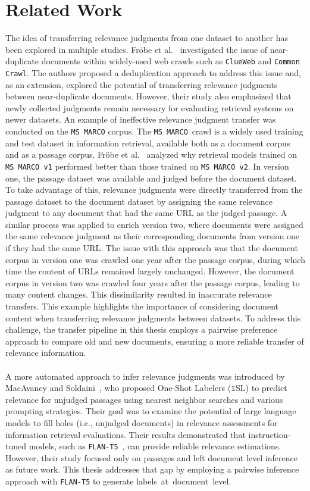 \chapter{Related Work}\label{related-work}

The idea of transferring relevance judgments from one dataset to another has been explored in multiple studies. Fr\"{o}be et al.~\cite{froebe:2021} investigated the issue of near-duplicate documents within widely-used web crawls such as \texttt{ClueWeb} and \texttt{Common Crawl}. The authors proposed a deduplication approach to address this issue and, as an extension, explored the potential of transferring relevance judgments between near-duplicate documents. However, their study also emphasized that newly collected judgments remain necessary for evaluating retrieval systems on newer datasets. An example of ineffective relevance judgment transfer was conducted on the  \texttt{MS MARCO} corpus. The \mbox{\texttt{MS MARCO} crawl} is a widely used training and test dataset in information retrieval, available both as a document corpus and as a passage corpus. Fr\"{o}be et al.~\cite{froebe:2022} analyzed  why retrieval models trained on \texttt{MS MARCO v1} performed better than those trained on \texttt{MS MARCO  v2}. In version one, the passage dataset was available and judged before the document dataset. To take advantage of this, relevance judgments were directly transferred from the passage dataset to the document dataset by assigning the same relevance judgment to any document that had the same URL as the judged passage. A similar process was applied to enrich version two, where documents were assigned the same relevance judgment as their corresponding documents from version one if they had the same URL. The issue with this approach was that the document corpus in version one was crawled one year after the passage corpus, during which time the content of URLs remained largely unchanged. However, the document corpus in version two was crawled four years after the passage corpus, leading to many content changes. This dissimilarity resulted in inaccurate relevance transfers. This example highlights the importance of considering document content when transferring relevance judgments between datasets. To address this challenge, the transfer pipeline in this thesis employs a pairwise preference approach to compare old and new documents, ensuring a more reliable transfer of relevance information.
\\\\
A more automated approach to infer relevance judgments was introduced by MacAvaney and Soldaini~\cite{macavaney:2023}, who proposed One-Shot Labelers ($\mathbb{1}$SL) to predict relevance for unjudged passages using nearest neighbor searches and various prompting strategies. Their goal was to examine the potential of large language models to fill \glqq holes\grqq{} (i.e., unjudged documents) in relevance assessments for information retrieval evaluations. Their results demonstrated that instruction-tuned models, such as \texttt{FLAN-T5}~\cite{chung:2022}, can provide reliable relevance estimations. However, their study focused only on passages and left document level inference as future work. This thesis addresses that gap by employing a pairwise inference approach with \texttt{FLAN-T5} to generate \mbox{labels at document level}.
